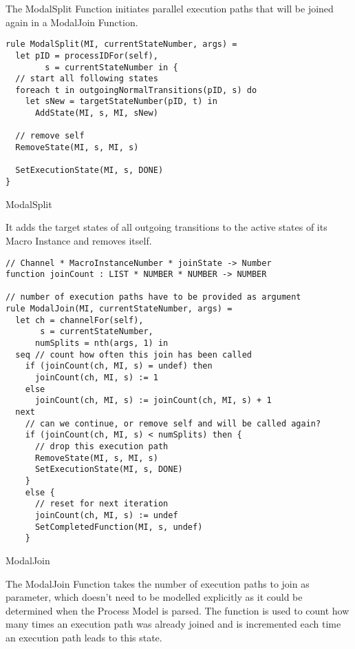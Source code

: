 The ModalSplit Function initiates parallel execution paths that will be joined
again in a ModalJoin Function.


\begin{listing}[H]
\begin{verbatim}
rule ModalSplit(MI, currentStateNumber, args) =
  let pID = processIDFor(self),
        s = currentStateNumber in {
  // start all following states
  foreach t in outgoingNormalTransitions(pID, s) do
    let sNew = targetStateNumber(pID, t) in
      AddState(MI, s, MI, sNew)

  // remove self
  RemoveState(MI, s, MI, s)

  SetExecutionState(MI, s, DONE)
}
\end{verbatim}
\caption{ModalSplit}
\label{lst:shortasm:ModalSplit}
\end{listing}


It adds the target states of all outgoing transitions to the active states of its
Macro Instance and removes itself.



\begin{listing}[H]
\begin{verbatim}
// Channel * MacroInstanceNumber * joinState -> Number
function joinCount : LIST * NUMBER * NUMBER -> NUMBER

// number of execution paths have to be provided as argument
rule ModalJoin(MI, currentStateNumber, args) =
  let ch = channelFor(self),
       s = currentStateNumber,
      numSplits = nth(args, 1) in
  seq // count how often this join has been called
    if (joinCount(ch, MI, s) = undef) then
      joinCount(ch, MI, s) := 1
    else
      joinCount(ch, MI, s) := joinCount(ch, MI, s) + 1
  next
    // can we continue, or remove self and will be called again?
    if (joinCount(ch, MI, s) < numSplits) then {
      // drop this execution path
      RemoveState(MI, s, MI, s)
      SetExecutionState(MI, s, DONE)
    }
    else {
      // reset for next iteration
      joinCount(ch, MI, s) := undef
      SetCompletedFunction(MI, s, undef)
    }
\end{verbatim}
\caption{ModalJoin}
\label{lst:shortasm:ModalJoin}
\end{listing}


The ModalJoin Function takes the number of execution paths to join as parameter,
which doesn't need to be modelled explicitly as it could be determined when the Process Model is parsed.
The  function is used to count how
many times an execution path was already joined and is incremented each time an
execution path leads to this state.

